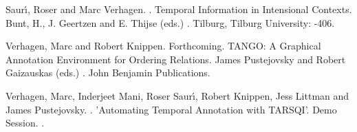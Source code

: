 \documentclass[12pt]{article}
\begin{document}
\begin{thebibliography}{}
Saur\'{\i}, Roser and Marc Verhagen.
.
\newblock Temporal Information in Intensional Contexts.
\newblock Bunt, H., J. Geertzen and E. Thijse (eds.)
.
\newblock Tilburg, Tilburg University:
-406.

Verhagen, Marc and Robert Knippen.
\newblock Forthcoming.
\newblock TANGO: A Graphical Annotation Environment for Ordering Relations.
\newblock James Pustejovsky and Robert Gaizauskas (eds.)
.
\newblock John Benjamin Publications.

Verhagen, Marc, Inderjeet Mani, Roser Saur\'{\i}, Robert Knippen, Jess Littman and James Pustejovsky.
.
\newblock 'Automating Temporal Annotation with TARSQI'.
\newblock Demo Session.
.



\end{thebibliography}
\end{document}

